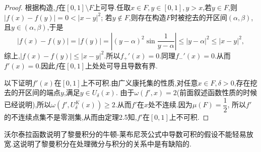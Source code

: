 \documentclass[a4paper,12pt]{article}
\begin{document}
{\begin{proof}
                根据构造,$f$在$[0,1]\setminus F$上可导.任取$x\in F,y\in[0,1],y>x$,若$y\in F$,则$|f(x)-f(y)|=0<|x-y|^2$;
                若$y\not\in F$,则存在构造$F$时被挖去的开区间$(\alpha,\beta)$,且$y\in(\alpha,\beta)$,于是
                $$|f(x)-f(y)|=|f(y)|=\left|(y-\alpha)^2\sin\dfrac{1}{y-\alpha}\right|\leqslant|y-\alpha|^2\leqslant|x-y|^2,$$
                综上,$|f(x)-f(y)|\leqslant |x-y|^2$.所以$f_+'(x)=0$.同理$f_-'(x)=0$.从而$f'(x)=0$.因此$f$在$[0,1]$上处处可导且导数有界.

                以下证明$f'(x)$在$[0,1]$上不可积.由广义康托集的性质,对任意$x\in F,\delta>0$,存在挖去的开区间的端点$y$,满足$y\in U_\delta(x)$.
                由于$\omega(f',x)=2$(前面叙述函数性质的时候已经说明),所以$\omega(f',U_\delta^K(x))\geqslant 2$.从而$f'$在$x$处不连续.因为$\mu(F)=\dfrac{1}{2}$,
                所以$f'$的不连续点集不是零测集,从而由定理2.5知,$f'$在$[0,1]$上不可积.
            \end{proof}

            沃尔泰拉函数说明了黎曼积分的牛顿-莱布尼茨公式中导数可积的假设不能轻易放宽.这说明了黎曼积分在处理微分与积分的关系中是有缺陷的.

}
\end{document}
